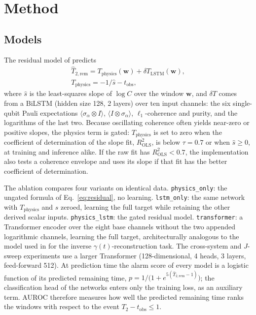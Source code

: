 \documentclass[twocolumn,10pt]{article}
\begin{document}
\section{Method}
\label{sec:method}

\subsection{Models}

The residual model of \cite{Paper1Brusnikin} predicts
\begin{gather}
  \widehat{T}_{2,\mathrm{rem}}
  = T_{\mathrm{physics}}(\mathbf{w})
  + \delta T_{\mathrm{LSTM}}(\mathbf{w}),
  \label{eq:residual}\\
  T_{\mathrm{physics}} = -1/\hat{s} - t_\mathrm{obs}, \nonumber
\end{gather}
where $\hat s$ is the least-squares slope of $\log C$ over the window
$\mathbf w$, and $\delta T$ comes from a BiLSTM
\cite{HochreiterSchmidhuber1997} (hidden size 128, 2 layers) over ten
input channels: the six single-qubit Pauli expectations
$\langle\sigma_\alpha\otimes I\rangle$, $\langle I\otimes\sigma_\alpha\rangle$,
$\ell_1$-coherence and purity, and the logarithms of the last two.
Because oscillating coherence often yields near-zero or positive slopes,
the physics term is gated: $T_\mathrm{physics}$ is set to zero when the
coefficient of determination of the slope fit, $R^2_\mathrm{OLS}$, is
below $\tau = 0.7$ or when $\hat s \ge 0$, at training and inference
alike. If the raw fit has $R^2_\mathrm{OLS}<0.7$, the implementation also
tests a coherence envelope and uses its slope if that fit has the better
coefficient of determination.

The ablation compares four variants on identical data.
\texttt{physics\_only}: the ungated formula of Eq.~\ref{eq:residual},
no learning.
\texttt{lstm\_only}: the same network with $T_\mathrm{physics}$ and
$\hat s$ zeroed, learning the full target while retaining the other
derived scalar inputs.
\texttt{physics\_lstm}: the gated residual model.
\texttt{transformer}: a Transformer encoder \cite{Vaswani2017} over the
eight base channels without the two appended logarithmic channels,
learning the full target, architecturally analogous to
the model used in \cite{TransformerLindblad2025} for the inverse
$\gamma(t)$-reconstruction task.
The cross-system and $J$-sweep experiments use a larger Transformer
(128-dimensional, 4 heads, 3 layers, feed-forward 512).
At prediction time the alarm score of every model is a logistic function
of its predicted remaining time,
$p = 1/\bigl(1+e^{5(\widehat T_{2,\mathrm{rem}}-1)}\bigr)$; the
classification head of the networks enters only the training loss, as an
auxiliary term. AUROC therefore measures how well the predicted remaining
time ranks the windows with respect to the event $T_2 - t_\mathrm{obs}\le1$.
\end{document}
